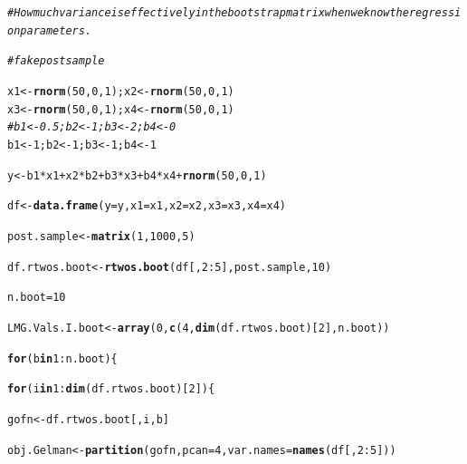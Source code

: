 \documentclass[11pt,a4paper,twoside]{book}\usepackage[]{graphicx}\usepackage[]{color}
\makeatletter
\newcommand{\hlnum}[1]{\textcolor[rgb]{0.686,0.059,0.569}{#1}}%
\newcommand{\hlcom}[1]{\textcolor[rgb]{0.678,0.584,0.686}{\textit{#1}}}%
\newcommand{\hlopt}[1]{\textcolor[rgb]{0,0,0}{#1}}%
\newcommand{\hlstd}[1]{\textcolor[rgb]{0.345,0.345,0.345}{#1}}%
\newcommand{\hlkwa}[1]{\textcolor[rgb]{0.161,0.373,0.58}{\textbf{#1}}}%
\newcommand{\hlkwb}[1]{\textcolor[rgb]{0.69,0.353,0.396}{#1}}%
\newcommand{\hlkwc}[1]{\textcolor[rgb]{0.333,0.667,0.333}{#1}}%
\newcommand{\hlkwd}[1]{\textcolor[rgb]{0.737,0.353,0.396}{\textbf{#1}}}%
\newenvironment{kframe}{%
 \def\at@end@of@kframe{}%
 \ifinner\ifhmode%
  \def\at@end@of@kframe{\end{minipage}}%
  \begin{minipage}{\columnwidth}%
 \fi\fi%
 \def\FrameCommand##1{\hskip\@totalleftmargin \hskip-\fboxsep
 \colorbox{shadecolor}{##1}\hskip-\fboxsep
     \hskip-\linewidth \hskip-\@totalleftmargin \hskip\columnwidth}%
 \MakeFramed {\advance\hsize-\width
   \@totalleftmargin\z@ \linewidth\hsize
   \@setminipage}}%
 {\par\unskip\endMakeFramed%
 \at@end@of@kframe}
\newenvironment{knitrout}{}{} %
\makeatother
\begin{document}
\begin{knitrout}
\color{fgcolor}\begin{kframe}
\begin{alltt}
\hlcom{#How much variance is effectively in the bootstrap matrix when we know the regression parameters.}

\hlcom{#fake post sample}

\hlstd{x1} \hlkwb{<-} \hlkwd{rnorm}\hlstd{(}\hlnum{50}\hlstd{,} \hlnum{0}\hlstd{,} \hlnum{1}\hlstd{); x2} \hlkwb{<-} \hlkwd{rnorm}\hlstd{(}\hlnum{50}\hlstd{,} \hlnum{0}\hlstd{,} \hlnum{1}\hlstd{)}
\hlstd{x3} \hlkwb{<-} \hlkwd{rnorm}\hlstd{(}\hlnum{50}\hlstd{,} \hlnum{0}\hlstd{,} \hlnum{1}\hlstd{); x4} \hlkwb{<-} \hlkwd{rnorm}\hlstd{(}\hlnum{50}\hlstd{,} \hlnum{0}\hlstd{,} \hlnum{1}\hlstd{)}
\hlcom{#b1 <- 0.5; b2 <- 1; b3 <- 2; b4 <- 0}
\hlstd{b1} \hlkwb{<-} \hlnum{1}\hlstd{; b2} \hlkwb{<-} \hlnum{1}\hlstd{; b3} \hlkwb{<-} \hlnum{1}\hlstd{; b4} \hlkwb{<-} \hlnum{1}

\hlstd{y} \hlkwb{<-} \hlstd{b1}\hlopt{*}\hlstd{x1} \hlopt{+} \hlstd{x2}\hlopt{*}\hlstd{b2} \hlopt{+} \hlstd{b3}\hlopt{*}\hlstd{x3} \hlopt{+} \hlstd{b4}\hlopt{*}\hlstd{x4} \hlopt{+} \hlkwd{rnorm}\hlstd{(}\hlnum{50}\hlstd{,} \hlnum{0}\hlstd{,} \hlnum{1}\hlstd{)}

\hlstd{df} \hlkwb{<-} \hlkwd{data.frame}\hlstd{(}\hlkwc{y} \hlstd{= y,} \hlkwc{x1} \hlstd{= x1,} \hlkwc{x2} \hlstd{= x2,} \hlkwc{x3} \hlstd{= x3,} \hlkwc{x4} \hlstd{= x4)}

\hlstd{post.sample} \hlkwb{<-} \hlkwd{matrix}\hlstd{(}\hlnum{1}\hlstd{,} \hlnum{1000}\hlstd{,}\hlnum{5}\hlstd{)}

\hlstd{df.rtwos.boot} \hlkwb{<-}\hlkwd{rtwos.boot}\hlstd{(df[,}\hlnum{2}\hlopt{:}\hlnum{5}\hlstd{], post.sample,} \hlnum{10}\hlstd{)}

\hlstd{n.boot} \hlkwb{=} \hlnum{10}

\hlstd{LMG.Vals.I.boot}\hlkwb{<-}\hlkwd{array}\hlstd{(}\hlnum{0}\hlstd{,} \hlkwd{c}\hlstd{(}\hlnum{4}\hlstd{,}\hlkwd{dim}\hlstd{(df.rtwos.boot)[}\hlnum{2}\hlstd{], n.boot))}

\hlkwa{for} \hlstd{(b} \hlkwa{in} \hlnum{1}\hlopt{:}\hlstd{n.boot)\{}

\hlkwa{for}\hlstd{(i} \hlkwa{in} \hlnum{1}\hlopt{:}\hlkwd{dim}\hlstd{(df.rtwos.boot)[}\hlnum{2}\hlstd{])\{}

        \hlstd{gofn}\hlkwb{<-}\hlstd{df.rtwos.boot[,i,b]}

        \hlstd{obj.Gelman}\hlkwb{<-}\hlkwd{partition}\hlstd{(gofn,} \hlkwc{pcan} \hlstd{=} \hlnum{4}\hlstd{,} \hlkwc{var.names} \hlstd{=} \hlkwd{names}\hlstd{(df[,}\hlnum{2}\hlopt{:}\hlnum{5}\hlstd{]))}


\end{alltt}
\end{kframe}
\end{knitrout}
\end{document}

